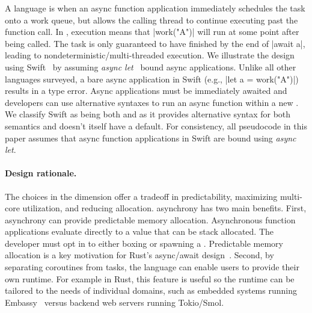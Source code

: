 A language is \seager when an async function application immediately schedules the task onto a work queue, but allows the calling thread to continue executing past the function call. In , \seager execution means that \code|work("A")| will run at some point after being called. The task is only guaranteed to have finished by the end of \code|await a|, leading to nondeterministic/multi-threaded execution. We illustrate the \seager design using Swift~\cite{mccall_swift_2021-1} by assuming \emph{async let}~\cite{apple:async-let} bound async applications.\footnotemark{} Unlike all other languages surveyed, a bare async application in Swift (e.g., \code|let a = work("A")|) results in a type error. Async applications must be immediately awaited and developers can use alternative syntaxes to run an async function within a new \task. We classify Swift as being both \eager and \seager as it provides alternative syntax for both semantics and doesn't itself have a default. For consistency, all pseudocode in this paper assumes that async function applications in Swift are bound using \emph{async let}.%
\cprotect{}

\paragraph{Design rationale.} The choices in the \eagerness dimension offer a tradeoff in predictability, maximizing  multi-core utilization, and reducing \task allocation.
%
\Lazy asynchrony has two main benefits. First, \lazy asynchrony can provide predictable memory allocation. Asynchronous function applications evaluate directly to a \coro value that can be stack allocated. The developer must opt in to either boxing or spawning a \coro. Predictable memory allocation is a key motivation for Rust's async/await design~\cite{withoutboats_why_2023}.
Second, by separating coroutines from tasks, the language can enable users to provide their own runtime. For example in Rust, this feature is useful so the runtime can be tailored to the needs of individual domains, such as embedded systems running Embassy~\cite{rust:embassy} versus backend web servers running Tokio/Smol.


